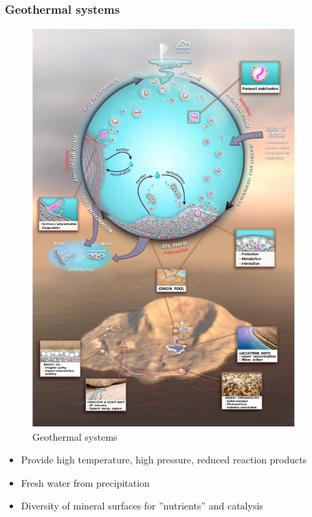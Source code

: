 \documentclass[]{article}
\begin{document}
\subsubsection{Geothermal systems}
\begin{figure}[h!]
	\caption{Geothermal systems \cite{damer2016field}}
	\includegraphics[width=0.9\textwidth]{GeothermalSystems}
\end{figure}

\begin{itemize}
	\item Provide high 	temperature, high
	pressure, reduced	reaction products
	\item Fresh water from 	precipitation
	\item Diversity of mineral	surfaces for ”nutrients” and catalysis
\end{itemize}
\end{document}
